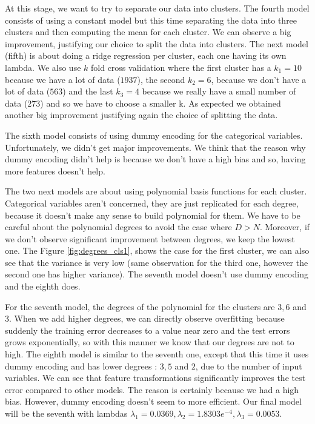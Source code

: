\documentclass{article} %
\begin{document}
At this stage, we want to try to separate our data into clusters. The fourth model consists of using a constant model but this time separating the data into three clusters and then computing the mean for each cluster. We can observe a big improvement, justifying our choice to split the data into clusters. The next model (fifth) is about doing a ridge regression per cluster, each one having its own lambda. We also use $k$ fold cross validation where the first cluster has a $k_1=10$ because we have a lot of data ($1937$), the second $k_2=6$, because we don't have a lot of data ($563$) and the last $k_3=4$ because we really have a small number of data ($273$) and so we have to choose a smaller k. As expected we obtained another big improvement justifying again the choice of splitting the data.

The sixth model consists of using dummy encoding for the categorical variables. Unfortunately, we didn't get major improvements. We think that the reason why dummy encoding didn't help is because we don't have a high bias and so, having more features doesn't help.

The two next models are about using polynomial basis functions for each cluster. Categorical variables aren't concerned, they are just replicated for each degree, because it doesn't make any sense to build polynomial for them.  We have to be careful about the polynomial degrees to avoid the case where $D > N$. Moreover, if we don't observe significant improvement between degrees, we keep the lowest one. The Figure \ref{fig:degrees_cls1}, shows the case for the first cluster, we can also see that the variance is very low (same observation for the third one, however the second one has higher variance). The seventh model doesn't use dummy encoding and the eighth does.

For the seventh model, the degrees of the polynomial for the clusters are $3,6$ and $3$. When we add higher degrees, we can directly observe overfitting because suddenly the training error decreases to a value near zero and the test errors grows exponentially, so with this manner we know that our degrees are not to high. The eighth model is similar to the seventh one, except that this time it uses dummy encoding and has lower degrees : $3,5$ and $2$, due to the number of input variables. We can see that feature transformations significantly improves the test error compared to other models. The reason is certainly because we had a high bias. However, dummy encoding doesn't seem to more efficient. Our final model will be the seventh with lambdas $\lambda_1 = 0.0369, \lambda_2 = 1.8303e^{-4}, \lambda_3 = 0.0053$.
\end{document}
